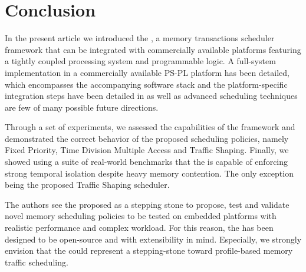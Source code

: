 \section{Conclusion}


In the present article we introduced the \schim, a memory transactions
scheduler framework that can be integrated with commercially available
platforms featuring a tightly coupled processing system and
programmable logic. A full-system implementation in a commercially
available PS-PL platform has been detailed, which encompasses the
accompanying software stack and the platform-specific integration
steps have been detailed in as well as advanced scheduling techniques
are few of many possible future directions.

Through a set of experiments, we assessed the capabilities of the
framework and demonstrated the correct behavior of the proposed
scheduling policies, namely Fixed Priority, Time Division Multiple
Access and Traffic Shaping. Finally, we showed using a suite of
real-world benchmarks that the \schim is capable of enforcing strong
temporal isolation despite heavy memory contention. The only exception being the proposed Traffic Shaping scheduler.

The authors see the proposed \schim as a stepping stone to propose,
test and validate novel memory scheduling policies to be tested on
embedded platforms with realistic performance and complex
workload. For this reason, the \schim has been designed to be
open-source and with extensibility in mind. Especially, we strongly
envision that the \schim could represent a stepping-stone toward
profile-based memory traffic scheduling.
